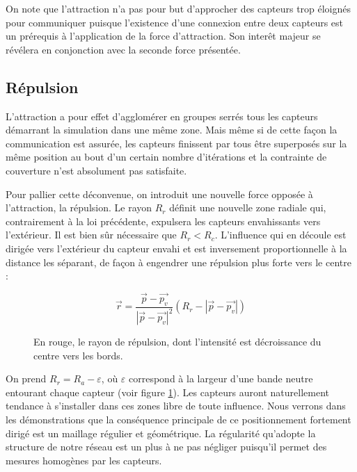 \documentclass[10pt]{article}
\begin{document}
\begin{multicols}{2}
On note que l'attraction n'a pas pour but d'approcher des capteurs
trop éloignés pour communiquer puisque l'existence d'une connexion
entre deux capteurs est un prérequis à l'application de la force
d'attraction. Son interêt majeur se révélera en conjonction avec la
seconde force présentée.

\subsection*{Répulsion}

L'attraction a pour effet d'agglomérer en groupes serrés tous les
capteurs démarrant la simulation dans une même zone. Mais même si de
cette façon la communication est assurée, les capteurs finissent par
tous être superposés sur la même position au bout d'un certain nombre
d'itérations et la contrainte de couverture n'est absolument pas
satisfaite.

Pour pallier cette déconvenue, on introduit une nouvelle force opposée
à l'attraction, la répulsion. Le rayon $R_r$ définit une nouvelle zone
radiale qui, contrairement à la loi précédente, expulsera les capteurs
envahissants vers l'extérieur. Il est bien sûr nécessaire que $R_r <
R_c$. L'influence qui en découle est dirigée vers l'extérieur du
capteur envahi et est inversement proportionnelle à la distance les
séparant, de façon à engendrer une répulsion plus forte vers le centre
\cite{Cheng2011497} :

$$
\vec{r} = \frac{\vec{p} - \vec{p_v}}{|\vec{p} - \vec{p_v}|^2}(R_r - |\vec{p} - \vec{p_v}|)
$$

\begin{figure}[H]

  \centering

  

  \caption{En rouge, le rayon de répulsion, dont l'intensité est
    décroissance du centre vers les bords.}
  \label{repulsion}

\end{figure}

On prend $R_r = R_a - \varepsilon$, o\`u $\varepsilon$ correspond à la
largeur d'une bande neutre entourant chaque capteur (voir figure
\ref{repulsion}). Les capteurs auront naturellement tendance à
s'installer dans ces zones libre de toute influence. Nous verrons dans
les démonstrations que la conséquence principale de ce positionnement
fortement dirigé est un maillage régulier et géométrique. La
régularité qu'adopte la structure de notre réseau est un plus à ne pas
négliger puisqu'il permet des mesures homogènes par les capteurs.


\end{multicols}
\end{document}
